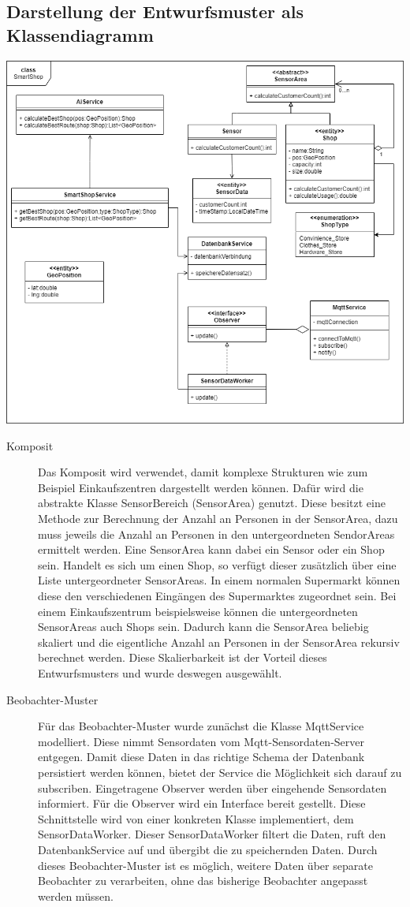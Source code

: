 \documentclass[runningheads]{llncs}
\begin{document}
\subsection{Darstellung der Entwurfsmuster als Klassendiagramm}
\includegraphics[width=\linewidth]{images/OOD-Klassendiagram}
\begin{description}
\item[Komposit]
Das Komposit wird verwendet, damit komplexe Strukturen wie zum Beispiel Einkaufszentren dargestellt werden können.
Dafür wird die abstrakte Klasse SensorBereich (SensorArea) genutzt. Diese besitzt eine Methode zur Berechnung der Anzahl an Personen in der SensorArea, dazu muss jeweils die Anzahl an Personen in den untergeordneten SendorAreas ermittelt werden.
Eine SensorArea kann dabei ein Sensor oder ein Shop sein.
Handelt es sich um einen Shop, so verfügt dieser zusätzlich über eine Liste untergeordneter SensorAreas.
In einem normalen Supermarkt können diese den verschiedenen Eingängen des Supermarktes zugeordnet sein.
Bei einem Einkaufszentrum beispielsweise können die untergeordneten SensorAreas auch Shops sein.
Dadurch kann die SensorArea beliebig skaliert und die eigentliche Anzahl an Personen in der SensorArea rekursiv berechnet werden.  
Diese Skalierbarkeit ist der Vorteil dieses Entwurfsmusters und wurde deswegen ausgewählt. 
\item[Beobachter-Muster]
Für das Beobachter-Muster wurde zunächst die Klasse MqttService modelliert. 
Diese nimmt Sensordaten vom Mqtt-Sensordaten-Server entgegen.
Damit diese Daten in das richtige Schema der Datenbank persistiert werden können, bietet der Service die Möglichkeit sich darauf zu subscriben.
Eingetragene Observer werden über eingehende Sensordaten informiert.
Für die Observer wird ein Interface bereit gestellt.
Diese Schnittstelle wird von einer konkreten Klasse implementiert, dem SensorDataWorker.
Dieser SensorDataWorker filtert die Daten, ruft den DatenbankService auf und übergibt die zu speichernden Daten.
Durch dieses Beobachter-Muster ist es möglich, weitere Daten über separate Beobachter zu verarbeiten, ohne das bisherige Beobachter angepasst werden müssen.
\end{description}
\end{document}
